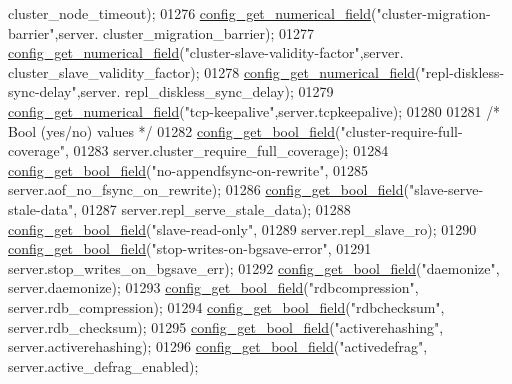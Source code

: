 \begin{DoxyCode}
{{{{{{{{{{      cluster\_node\_timeout);
01276     \hyperlink{config_8c_ac10aa922264623cceca62df3262920c6}{config\_get\_numerical\_field}(\textcolor{stringliteral}{"cluster-migration-barrier"},server.
      cluster\_migration\_barrier);
01277     \hyperlink{config_8c_ac10aa922264623cceca62df3262920c6}{config\_get\_numerical\_field}(\textcolor{stringliteral}{"cluster-slave-validity-factor"},server.
      cluster\_slave\_validity\_factor);
01278     \hyperlink{config_8c_ac10aa922264623cceca62df3262920c6}{config\_get\_numerical\_field}(\textcolor{stringliteral}{"repl-diskless-sync-delay"},server.
      repl\_diskless\_sync\_delay);
01279     \hyperlink{config_8c_ac10aa922264623cceca62df3262920c6}{config\_get\_numerical\_field}(\textcolor{stringliteral}{"tcp-keepalive"},server.tcpkeepalive);
01280 
01281     \textcolor{comment}{/* Bool (yes/no) values */}
01282     \hyperlink{config_8c_a7dbc6f4e538d2db2aa10ae47511d6c92}{config\_get\_bool\_field}(\textcolor{stringliteral}{"cluster-require-full-coverage"},
01283             server.cluster\_require\_full\_coverage);
01284     \hyperlink{config_8c_a7dbc6f4e538d2db2aa10ae47511d6c92}{config\_get\_bool\_field}(\textcolor{stringliteral}{"no-appendfsync-on-rewrite"},
01285             server.aof\_no\_fsync\_on\_rewrite);
01286     \hyperlink{config_8c_a7dbc6f4e538d2db2aa10ae47511d6c92}{config\_get\_bool\_field}(\textcolor{stringliteral}{"slave-serve-stale-data"},
01287             server.repl\_serve\_stale\_data);
01288     \hyperlink{config_8c_a7dbc6f4e538d2db2aa10ae47511d6c92}{config\_get\_bool\_field}(\textcolor{stringliteral}{"slave-read-only"},
01289             server.repl\_slave\_ro);
01290     \hyperlink{config_8c_a7dbc6f4e538d2db2aa10ae47511d6c92}{config\_get\_bool\_field}(\textcolor{stringliteral}{"stop-writes-on-bgsave-error"},
01291             server.stop\_writes\_on\_bgsave\_err);
01292     \hyperlink{config_8c_a7dbc6f4e538d2db2aa10ae47511d6c92}{config\_get\_bool\_field}(\textcolor{stringliteral}{"daemonize"}, server.daemonize);
01293     \hyperlink{config_8c_a7dbc6f4e538d2db2aa10ae47511d6c92}{config\_get\_bool\_field}(\textcolor{stringliteral}{"rdbcompression"}, server.rdb\_compression);
01294     \hyperlink{config_8c_a7dbc6f4e538d2db2aa10ae47511d6c92}{config\_get\_bool\_field}(\textcolor{stringliteral}{"rdbchecksum"}, server.rdb\_checksum);
01295     \hyperlink{config_8c_a7dbc6f4e538d2db2aa10ae47511d6c92}{config\_get\_bool\_field}(\textcolor{stringliteral}{"activerehashing"}, server.activerehashing);
01296     \hyperlink{config_8c_a7dbc6f4e538d2db2aa10ae47511d6c92}{config\_get\_bool\_field}(\textcolor{stringliteral}{"activedefrag"}, server.active\_defrag\_enabled);
}}}}}}}}}}
\end{DoxyCode}

